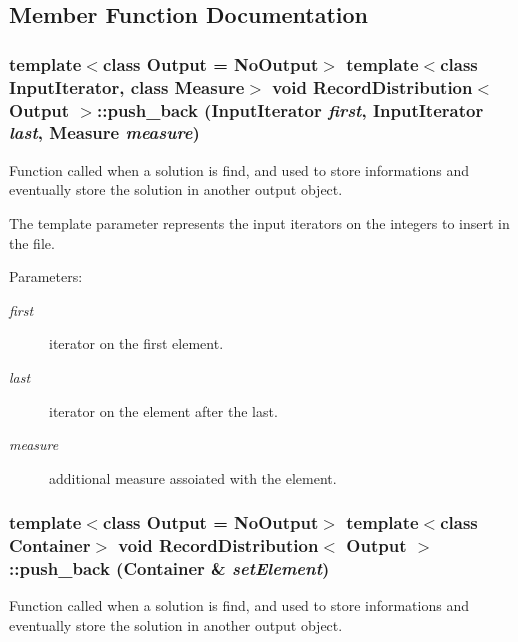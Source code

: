 \subsection{Member Function Documentation}
\subsubsection{\setlength{\rightskip}{0pt plus 5cm}template$<$class Output = No\-Output$>$ template$<$class Input\-Iterator, class Measure$>$ void {\bf Record\-Distribution}$<$ Output $>$::push\_\-back (Input\-Iterator {\em first}, Input\-Iterator {\em last}, Measure {\em measure})\hspace{0.3cm}{\tt  [inline]}}\label{class_record_distribution_cbe7f0b5cc0f3a0b8f377dfa458f29dd}


Function called when a solution is find, and used to store informations and eventually store the solution in another output object. 

The template parameter represents the input iterators on the integers to insert in the file. \begin{Desc}
\item[Parameters:]
\begin{description}
\item[{\em first}]iterator on the first element. \item[{\em last}]iterator on the element after the last. \item[{\em measure}]additional measure assoiated with the element. \end{description}
\end{Desc}
\subsubsection{\setlength{\rightskip}{0pt plus 5cm}template$<$class Output = No\-Output$>$ template$<$class Container$>$ void {\bf Record\-Distribution}$<$ Output $>$::push\_\-back (Container \& {\em set\-Element})\hspace{0.3cm}{\tt  [inline]}}\label{class_record_distribution_de2a7208d4488d81d383f10965b34cff}


Function called when a solution is find, and used to store informations and eventually store the solution in another output object. 


